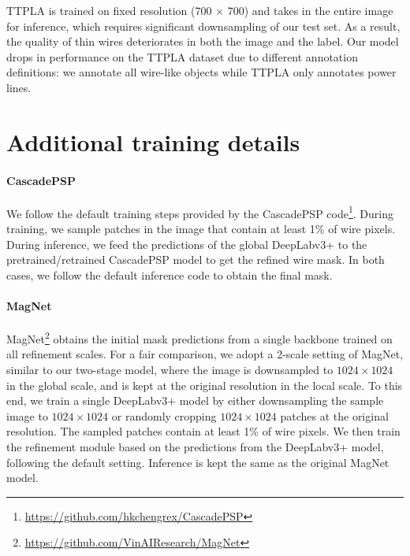 \documentclass[10pt,twocolumn,letterpaper]{article}
\makeatletter
\newcommand\footnoteref[1]{\protected@xdef\@thefnmark{\ref{#1}}\@footnotemark}
\makeatother
\begin{document}
TTPLA is trained on fixed resolution (700 $\times$ 700) and takes in the entire image for inference, which requires significant downsampling of our test set.
As a result, the quality of thin wires deteriorates in both the image and the label. Our model drops in performance on the TTPLA dataset due to different annotation definitions: we annotate all wire-like objects while TTPLA only annotates power lines.

\vspace{-1mm}
\section{Additional training details}
\vspace{-1mm}
\paragraph{CascadePSP~\cite{cascadepsp}}
We follow the default training steps provided by the CascadePSP code\footnote{\label{note1}\href{https://github.com/hkchengrex/CascadePSP}{https://github.com/hkchengrex/CascadePSP}}. During training, we sample patches in the image that contain at least 1\% of wire pixels. During inference, we feed the predictions of the global DeepLabv3+ to the pretrained/retrained CascadePSP model to get the refined wire mask. In both cases, we follow the default inference code\footnoteref{note1} to obtain the final mask.
\vspace{-3mm}
\paragraph{MagNet~\cite{magnet}} MagNet\footnote{\href{https://github.com/VinAIResearch/MagNet}{https://github.com/VinAIResearch/MagNet}} obtains the initial mask predictions from a single backbone trained on all refinement scales. For a fair comparison, we adopt a 2-scale setting of MagNet, similar to our two-stage model, where the image is downsampled to $1024\times 1024$ in the global scale, and is kept at the original resolution in the local scale. To this end, we train a single DeepLabv3+ model by either downsampling the sample image to $1024\times 1024$ or randomly cropping $1024\times 1024$ patches at the original resolution. The sampled patches contain at least 1\% of wire pixels. We then train the refinement module based on the predictions from the DeepLabv3+ model, following the default setting. Inference is kept the same as the original MagNet model.
\end{document}
